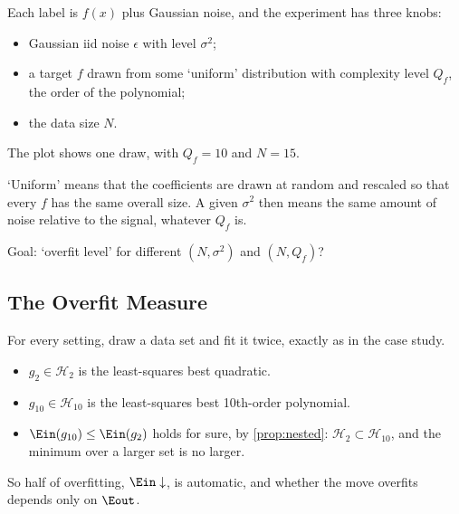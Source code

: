 Each label is \(f(x)\) plus Gaussian noise, and the experiment has three
knobs:
\begin{itemize}
    \item Gaussian iid noise \(\epsilon\) with level \(\sigma^2\);
    \item a target \(f\) drawn from some `uniform' distribution with
        complexity level \(Q_f\), the order of the polynomial;
    \item the data size \(N\).
\end{itemize}
The plot shows one draw, with \(Q_f = 10\) and \(N = 15\).

`Uniform' means that the coefficients are drawn at random and rescaled so that
every \(f\) has the same overall size. A given \(\sigma^2\) then means the same
amount of noise relative to the signal, whatever \(Q_f\) is.

\begin{question}
    Goal: `overfit level' for different \((N, \sigma^2)\) and \((N, Q_f)\)?
\end{question}

\subsection{The Overfit Measure}

\begin{center}
\end{center}

For every setting, draw a data set and fit it twice, exactly as in the case
study.
\begin{itemize}
    \item \(g_2 \in \mathcal{H}_2\) is the least-squares best quadratic.
    \item \(g_{10} \in \mathcal{H}_{10}\) is the least-squares best 10th-order
        polynomial.
    \item \(\Ein(g_{10}) \le \Ein(g_2)\) holds for sure, by
        \autoref{prop:nested}: \(\mathcal{H}_2 \subset \mathcal{H}_{10}\), and
        the minimum over a larger set is no larger.
\end{itemize}
So half of overfitting, \(\Ein \downarrow\), is automatic, and whether the move
overfits depends only on \(\Eout\).

